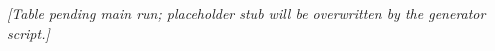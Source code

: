 \begin{center}\itshape [Table pending main run; placeholder stub will be overwritten by the generator script.]\end{center}

